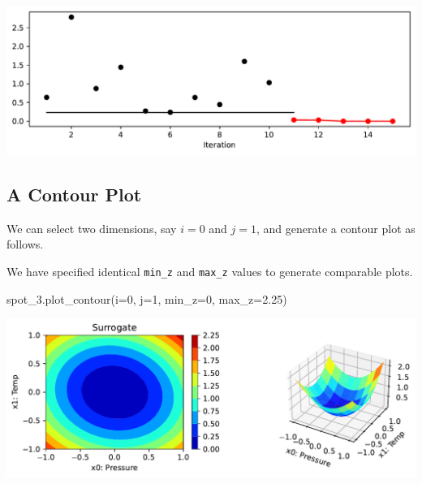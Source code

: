 \documentclass[
  letterpaper,
  DIV=11,
  numbers=noendperiod]{scrreprt}
\newenvironment{Shaded}{\begin{snugshade}}{\end{snugshade}}
\newcommand{\DecValTok}[1]{\textcolor[rgb]{0.68,0.00,0.00}{#1}}
\newcommand{\FloatTok}[1]{\textcolor[rgb]{0.68,0.00,0.00}{#1}}
\newcommand{\NormalTok}[1]{\textcolor[rgb]{0.00,0.23,0.31}{#1}}
\newcommand{\OperatorTok}[1]{\textcolor[rgb]{0.37,0.37,0.37}{#1}}
\begin{document}
\includegraphics{008_num_spot_multidim_files/figure-pdf/cell-6-output-1.pdf}

\subsection{A Contour Plot}\label{a-contour-plot}

We can select two dimensions, say \(i=0\) and \(j=1\), and generate a
contour plot as follows.

\begin{tcolorbox}[enhanced jigsaw, rightrule=.15mm, coltitle=black, title=\textcolor{quarto-callout-note-color}{\faInfo}\hspace{0.5em}{Note:}, opacitybacktitle=0.6, bottomrule=.15mm, opacityback=0, left=2mm, colback=white, leftrule=.75mm, colframe=quarto-callout-note-color-frame, colbacktitle=quarto-callout-note-color!10!white, toprule=.15mm, toptitle=1mm, bottomtitle=1mm, titlerule=0mm, breakable, arc=.35mm]

We have specified identical \texttt{min\_z} and \texttt{max\_z} values
to generate comparable plots.

\end{tcolorbox}

\begin{Shaded}
\begin{Highlighting}[]
\NormalTok{spot\_3.plot\_contour(i}\OperatorTok{=}\DecValTok{0}\NormalTok{, j}\OperatorTok{=}\DecValTok{1}\NormalTok{, min\_z}\OperatorTok{=}\DecValTok{0}\NormalTok{, max\_z}\OperatorTok{=}\FloatTok{2.25}\NormalTok{)}
\end{Highlighting}
\end{Shaded}

\includegraphics{008_num_spot_multidim_files/figure-pdf/cell-7-output-1.pdf}
\end{document}
